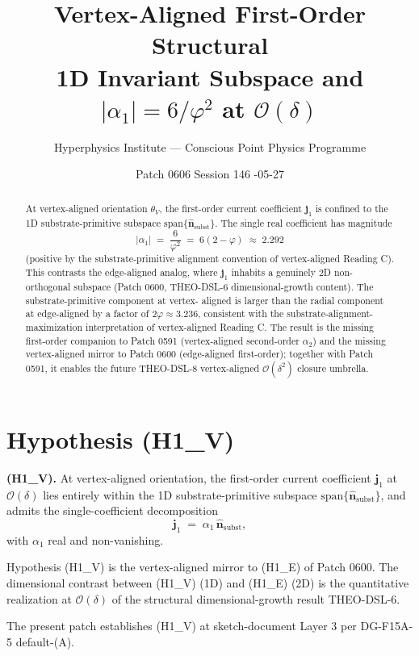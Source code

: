\documentclass[11pt]{article}
\title{Vertex-Aligned First-Order Structural \\[2pt]
\large 1D Invariant Subspace and $|\alpha_1| = 6/\varphi^2$ at $\mathcal{O}(\delta)$}
\author{Hyperphysics Institute --- Conscious Point Physics Programme}
\date{Patch 0606 \quad Session 146 \quad 2026-05-27}
\begin{document}
\maketitle

\begin{abstract}
At vertex-aligned orientation $\theta_V$, the first-order current
coefficient $\mathbf{j}_1$ is confined to the 1D substrate-primitive
subspace $\mathrm{span}\{\hat{\mathbf{n}}_{\text{subst}}\}$. The single
real coefficient has magnitude
\[
|\alpha_1| \;=\; \frac{6}{\varphi^2} \;=\; 6(2-\varphi) \;\approx\; 2.292
\]
(positive by the substrate-primitive alignment convention of vertex-aligned
Reading C). This contrasts the edge-aligned analog, where $\mathbf{j}_1$
inhabits a genuinely 2D non-orthogonal subspace (Patch 0600, THEO-DSL-6
dimensional-growth content). The substrate-primitive component at vertex-
aligned is larger than the radial component at edge-aligned by a factor
of $2\varphi \approx 3.236$, consistent with the
substrate-alignment-maximization interpretation of vertex-aligned
Reading C. The result is the missing first-order companion to Patch 0591
(vertex-aligned second-order $\alpha_2$) and the missing vertex-aligned
mirror to Patch 0600 (edge-aligned first-order); together with
Patch 0591, it enables the future THEO-DSL-8 vertex-aligned
$\mathcal{O}(\delta^2)$ closure umbrella.
\end{abstract}

\section{Hypothesis (H1\_V)}

\noindent\textbf{(H1\_V).} At vertex-aligned orientation, the first-order
current coefficient $\mathbf{j}_1$ at $\mathcal{O}(\delta)$ lies entirely
within the 1D substrate-primitive subspace
$\mathrm{span}\{\hat{\mathbf{n}}_{\text{subst}}\}$, and admits the
single-coefficient decomposition
\begin{equation}
\mathbf{j}_1 \;=\; \alpha_1\,\hat{\mathbf{n}}_{\text{subst}},
\label{eq:H1V}
\end{equation}
with $\alpha_1$ real and non-vanishing.

\medskip
Hypothesis (H1\_V) is the vertex-aligned mirror to (H1\_E) of Patch 0600.
The dimensional contrast between (H1\_V) (1D) and (H1\_E) (2D) is the
quantitative realization at $\mathcal{O}(\delta)$ of the structural
dimensional-growth result THEO-DSL-6.

The present patch establishes (H1\_V) at sketch-document Layer 3 per
DG-F15A-5 default-(A).
\end{document}

